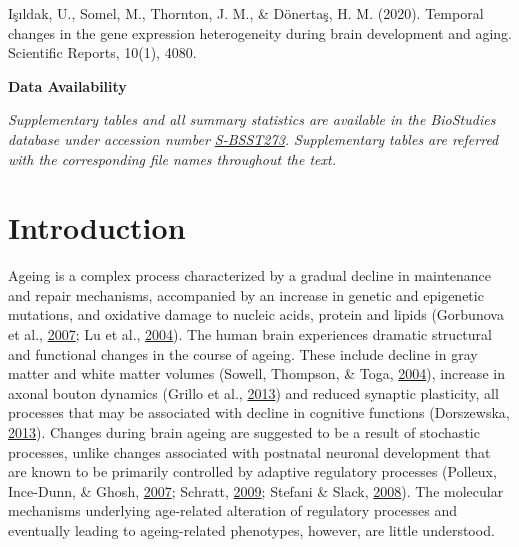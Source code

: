\documentclass[12pt,twoside]{unicam}
\begin{document}
Işıldak, U., Somel, M., Thornton, J. M., \& Dönertaş, H. M. (2020). Temporal changes in the gene expression heterogeneity during brain development and aging. Scientific Reports, 10(1), 4080.

\textbf{Data Availability}

\emph{Supplementary tables and all summary statistics are available in the BioStudies database under accession number \href{https://www.ebi.ac.uk/biostudies/studies/S-BSST273}{S-BSST273}. Supplementary tables are referred with the corresponding file names throughout the text.}
\normalsize

\hypertarget{introduction-1}{%
\section{Introduction}\label{introduction-1}}

Ageing is a complex process characterized by a gradual decline in maintenance and repair mechanisms, accompanied by an increase in genetic and epigenetic mutations, and oxidative damage to nucleic acids, protein and lipids (Gorbunova et al., \protect\hyperlink{ref-Gorbunova2007}{2007}; Lu et al., \protect\hyperlink{ref-Lu2004}{2004}). The human brain experiences dramatic structural and functional changes in the course of ageing. These include decline in gray matter and white matter volumes (Sowell, Thompson, \& Toga, \protect\hyperlink{ref-Sowell2004}{2004}), increase in axonal bouton dynamics (Grillo et al., \protect\hyperlink{ref-Grillo2013}{2013}) and reduced synaptic plasticity, all processes that may be associated with decline in cognitive functions (Dorszewska, \protect\hyperlink{ref-Dorszewska2013}{2013}). Changes during brain ageing are suggested to be a result of stochastic processes, unlike changes associated with postnatal neuronal development that are known to be primarily controlled by adaptive regulatory processes (Polleux, Ince-Dunn, \& Ghosh, \protect\hyperlink{ref-Polleux2007}{2007}; Schratt, \protect\hyperlink{ref-Schratt2009}{2009}; Stefani \& Slack, \protect\hyperlink{ref-Stefani2008}{2008}). The molecular mechanisms underlying age-related alteration of regulatory processes and eventually leading to ageing-related phenotypes, however, are little understood.
\end{document}
